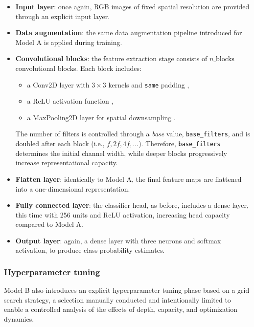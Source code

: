 \documentclass[11pt,a4paper]{article}
\begin{document}
\begin{itemize}
    \item \textbf{Input layer}: once again, RGB images of fixed spatial resolution are provided through an explicit input layer.
    
    \item \textbf{Data augmentation}: the same data augmentation pipeline introduced for Model A is applied during training.
    
    \item \textbf{Convolutional blocks}: the feature extraction stage consists of $n\_\text{blocks}$ convolutional blocks.  
    Each block includes:
    \begin{itemize}
        \item a Conv2D layer with $3\times3$ kernels and \texttt{same} padding \cite{keras_conv2d},
        \item a ReLU activation function \cite{keras_relu},
        \item a MaxPooling2D layer for spatial downsampling \cite{keras_maxpooling2d}.
    \end{itemize}
    The number of filters is controlled through a \emph{base} value, \texttt{base\_filters}, and is doubled after each block (i.e., $f, 2f, 4f,\dots$).  
    Therefore, \texttt{base\_filters} determines the initial channel width, while deeper blocks progressively increase representational capacity.

    \item \textbf{Flatten layer}: identically to Model A, the final feature maps are flattened into a one-dimensional representation.
    
    \item \textbf{Fully connected layer}: the classifier head, as before, includes a dense layer, this time with 256 units and ReLU activation, increasing head capacity compared to Model A.
    
    \item \textbf{Output layer}: again, a dense layer with three neurons and softmax activation, to produce class probability estimates.
\end{itemize}

\subsubsection{Hyperparameter tuning}

Model B also introduces an explicit hyperparameter tuning phase based on a grid search strategy, a selection manually conducted and intentionally limited to enable a controlled analysis of the effects of depth, capacity, and optimization dynamics.
\end{document}
